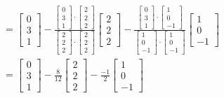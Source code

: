 \documentclass[11pt]{article}
\theoremstyle{definition}
\begin{document}
\begin{enumerate}
\begin{align*}
            & = \begin{bmatrix} 0 \\ 3 \\ 1 \end{bmatrix} - \frac{\begin{bmatrix} 0 \\ 3 \\ 1 \end{bmatrix} \cdot \begin{bmatrix} 2 \\ 2 \\ 2 \end{bmatrix}}{\begin{bmatrix} 2 \\ 2 \\ 2 \end{bmatrix} \cdot \begin{bmatrix} 2 \\ 2 \\ 2 \end{bmatrix}}\begin{bmatrix} 2 \\ 2 \\ 2 \end{bmatrix} - \frac{\begin{bmatrix} 0 \\ 3 \\ 1 \end{bmatrix} \cdot \begin{bmatrix} 1 \\ 0 \\ -1 \end{bmatrix}}{\begin{bmatrix} 1 \\ 0 \\ -1 \end{bmatrix} \cdot \begin{bmatrix} 1 \\ 0 \\ -1 \end{bmatrix}}\begin{bmatrix} 1 \\ 0 \\ -1 \end{bmatrix}\\
            & = \begin{bmatrix} 0 \\ 3 \\ 1 \end{bmatrix} - \frac{8}{12}\begin{bmatrix} 2 \\ 2 \\ 2 \end{bmatrix} - \frac{-1}{2}\begin{bmatrix} 1 \\ 0 \\ -1 \end{bmatrix}\\ 

\end{align*}
\end{enumerate}
\end{document}
